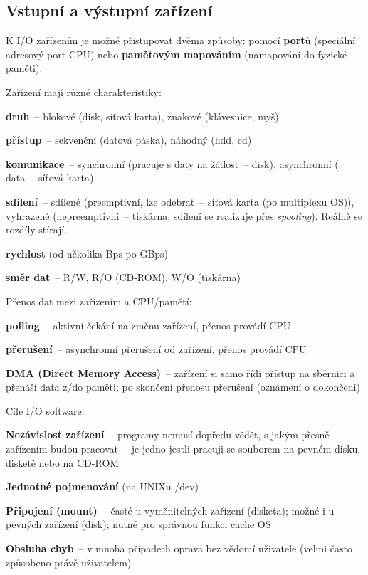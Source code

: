 \subsection{Vstupní a výstupní zařízení}

K I/O zařízením je možné přistupovat dvěma způsoby: pomocí \textbf{port}ů (speciální adresový port CPU) nebo \textbf{pamětovým mapováním} (namapování do fyzické paměti).

Zařízení mají různé charakteristiky:
\begin{pitemize}
	\item \textbf{druh}~-- blokové (disk, síťová karta), znakové (klávesnice, myš)
	\item \textbf{přístup}~-- sekvenční (datová páska), náhodný (hdd, cd)
	\item \textbf{komunikace}~-- synchronní (pracuje s daty na žádost~-- disk), asynchronní ( data~-- síťová karta)
	\item \textbf{sdílení}~-- sdílené (preemptivní, lze odebrat~-- síťová karta (po multiplexu OS)), vyhrazené (nepreemptivní~-- tiskárna, sdílení se realizuje přes \emph{spooling}). Reálně se rozdíly stírají.
	\item \textbf{rychlost} (od několika Bps po GBps)
	\item \textbf{směr dat}~-- R/W, R/O (CD-ROM), W/O (tiskárna) 
\end{pitemize}

Přenos dat mezi zařízením a CPU/pamětí:
\begin{pitemize}
	\item \textbf{polling}~-- aktivní čekání na změnu zařízení, přenos provádí CPU
	\item \textbf{přerušení}~-- asynchronní přerušení od zařízení, přenos provádí CPU
	\item \textbf{DMA (Direct Memory Access)}~-- zařízení si samo řídí přístup na sběrnici a přenáší data z/do paměti; po skončení přenosu přerušení (oznámení o dokončení)
\end{pitemize}

Cíle I/O software:
\begin{pitemize}
	\item \textbf{Nezávislost zařízení}~-- programy nemusí dopředu vědět, s jakým přesně zařízením budou pracovat~-- je jedno jestli pracuji se souborem na pevném disku, disketě nebo na CD-ROM
	\item \textbf{Jednotné pojmenování} (na UNIXu /dev)
	\item \textbf{Připojení (mount)}~-- časté u vyměnitelných zařízení (disketa); možné i u pevných zařízení (disk); nutné pro správnou funkci cache OS
	\item \textbf{Obsluha chyb}~-- v mnoha případech oprava bez vědomí uživatele (velmi často způsobeno právě uživatelem)
\end{pitemize}
